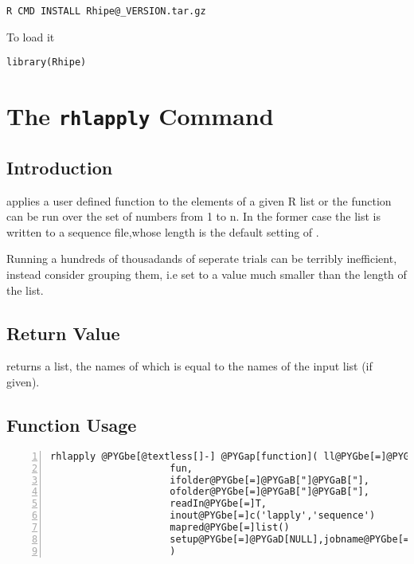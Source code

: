 \documentclass[letterpaper,10pt,english]{manual}
\begin{document}
\begin{Verbatim}[commandchars=@\[\]]
R CMD INSTALL Rhipe@_VERSION.tar.gz
\end{Verbatim}

To load it

\begin{Verbatim}[commandchars=@\[\]]
library(Rhipe)
\end{Verbatim}

\resetcurrentobjects
\hypertarget{--doc-rhlapply}{}

\chapter{The \texttt{rhlapply} Command}


\section{Introduction}

 applies a user defined function to the elements of a given
R list or the function can be run over the set of numbers from 1 to
n. In the former case the list is written to a sequence file,whose length is the
default setting of .

Running a hundreds of thousadands of seperate trials
can be terribly inefficient, instead consider grouping them, i.e set
 to a value much smaller than the length of the
list.


\section{Return Value}

 returns a list, the names of which is equal to the names
of the input list (if given).


\section{Function Usage}

\begin{Verbatim}[commandchars=@\[\],numbers=left,firstnumber=1,stepnumber=1]
rhlapply @PYGbe[@textless[]-] @PYGap[function]( ll@PYGbe[=]@PYGaD[NULL],
                     fun,
                     ifolder@PYGbe[=]@PYGaB["]@PYGaB["],
                     ofolder@PYGbe[=]@PYGaB["]@PYGaB["],
                     readIn@PYGbe[=]T,
                     inout@PYGbe[=]c('lapply','sequence')
                     mapred@PYGbe[=]list()
                     setup@PYGbe[=]@PYGaD[NULL],jobname@PYGbe[=]@PYGaB["]@PYGaB[rhlapply"],...
                     )
\end{Verbatim}
\end{document}

